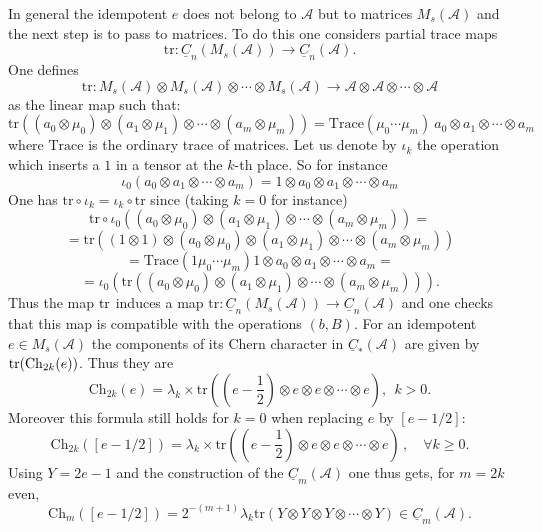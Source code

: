 \documentclass[12pt]{article}
\def\qqq{\,,\quad \forall}
\def\tr{{\rm tr}}
\def\tr{{\rm tr}}
\def\cA{{\mathcal A}}
\def\qqq{\,,\quad \forall}
\begin{document}
In general the idempotent $e$ does not belong to $\cA$ but to matrices $M_{s}(\mathcal{A})$ and 
the next step is to pass to matrices. To do this one considers partial trace maps 
$$
\mathrm{tr}:\underline{C}_n(M_{s}(\mathcal{A}))\to \underline{C}_n(\cA).
$$
One defines 
\[
\mathrm{tr}:M_{s}(\mathcal{A})\otimes M_{s}(\mathcal{A})\otimes\cdots\otimes
M_{s}(\mathcal{A})\rightarrow\mathcal{A}\otimes\mathcal{A}\otimes\cdots
\otimes\mathcal{A}%
\]
as the linear map such that:
$$
\mathrm{tr}\left(  (a_{0} \otimes\mu_{0})\otimes(a_{1}\otimes\mu_{1}%
)\otimes\cdots\otimes(a_{m}\otimes\mu_{m})\right)  = \mathrm{Trace}(\mu
_{0}\cdots\mu_{m})\ a_{0}\otimes a_{1}\otimes\cdots\otimes a_{m}%
$$
where $\mathrm{Trace}$ is the ordinary trace of matrices. 
Let us denote by
$\iota_{k}$ the operation which inserts a $1$ in a tensor at the $k$-th place.
So for instance
\[
\iota_{0}(a_{0}\otimes a_{1}\otimes\cdots\otimes a_{m})=1\otimes a_{0}\otimes
a_{1}\otimes\cdots\otimes a_{m}%
\]
One has $\mathrm{tr}\circ\iota_{k}=\iota_{k}\circ\mathrm{tr}$ since (taking
$k=0$ for instance)
\[
\mathrm{tr}\circ\iota_{0}\left(  (a_{0}\otimes\mu_{0})\otimes(a_{1}\otimes
\mu_{1})\otimes\cdots\otimes(a_{m}\otimes\mu_{m})\right)  =
\]%
\[
=\mathrm{tr}\left(  (1\otimes1)\otimes(a_{0}\otimes\mu_{0})\otimes
(a_{1}\otimes\mu_{1})\otimes\cdots\otimes(a_{m}\otimes\mu_{m})\right)
\]%
\[
=\mathrm{Trace}(1\mu_{0}\cdots\mu_{m})1\otimes a_{0}\otimes a_{1}\otimes
\cdots\otimes a_{m}=
\]%
\[
=\iota_{0}\left(  \mathrm{tr}\left(  (a_{0}\otimes\mu_{0})\otimes(a_{1}%
\otimes\mu_{1})\otimes\cdots\otimes(a_{m}\otimes\mu_{m})\right)  \right).
\]
Thus the map $\tr$ induces a map $\mathrm{tr}:\underline{C}_n(M_{s}(\mathcal{A}))\to \underline{C}_n(\cA)$ and one checks that this map is compatible with the operations $(b,B)$. For an idempotent $e\in M_{s}(\mathcal{A})$ the components of its Chern character in $\underline{C}_*(\cA)$ are given by $\tr(\mathrm{Ch}_{2k}(e))$. Thus  they are 
$$
\mathrm{Ch}_{2k}(e)=\lambda_k \times \mathrm{tr}\left((e-\frac 12)\otimes e \otimes e \otimes \cdots  \otimes e\right), \ \ k>0. 
$$
Moreover this formula still holds  for $k=0$ when replacing $e$ by $[e-1/2]$:
$$
\mathrm{Ch}_{2k}([e-1/2])=\lambda_k \times \mathrm{tr}\left((e-\frac 12)\otimes e \otimes e \otimes \cdots  \otimes e\right) \qqq k\geq 0.
$$
Using $Y=2e-1$ and the construction of the $\underline{C}_m(\cA)$ one thus gets, for $m=2k$ even, 
\begin{equation}\label{phim}
	\mathrm{Ch}_{m}([e-1/2])=2^{-(m+1)}\lambda_k\mathrm{tr}\left(  Y\otimes Y\otimes Y\otimes
\cdots\otimes Y\right)  \in\underline{C}_m(\cA). 
\end{equation}
\end{document}
